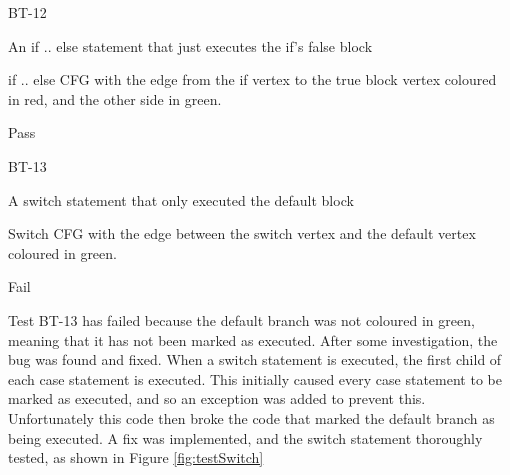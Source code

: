 \begin{minipage}{0.6\textwidth}
\begin{description}[style=sameline,leftmargin=3.5cm,nolistsep]
\item[\hspace*{0.3cm}Label] BT-12
\item[\hspace*{0.3cm}Description] An if .. else statement that just executes the if's false block
\item[\hspace*{0.3cm}Expected Output] if .. else CFG with the edge from the if vertex to the true block vertex coloured in red, and the other side in green.
\item[\hspace*{0.3cm}Result] Pass
\end{description}
\end{minipage}
\begin{minipage}{0.39\textwidth}
\centering
{}
\end{minipage}

\begin{minipage}{0.6\textwidth}
\begin{description}[style=sameline,leftmargin=3.5cm,nolistsep]
\item[\hspace*{0.3cm}Label] BT-13
\item[\hspace*{0.3cm}Description] A switch statement that only executed the default block
\item[\hspace*{0.3cm}Expected Output] Switch CFG with the edge between the switch vertex and the default vertex coloured in green. 
\item[\hspace*{0.3cm}Result] Fail
\end{description}
\end{minipage}
\begin{minipage}{0.39\textwidth}
\centering
{}
\end{minipage}

Test BT-13 has failed because the default branch was not coloured in green, meaning that it has not been marked as executed. After some investigation, the bug was found and fixed. When a switch statement is executed, the first child of each case statement is executed. This initially caused every case statement to be marked as executed, and so an exception was added to prevent this. Unfortunately this code then broke the code that marked the default branch as being executed. A fix was implemented, and the switch statement thoroughly tested, as shown in Figure \ref{fig:testSwitch}

